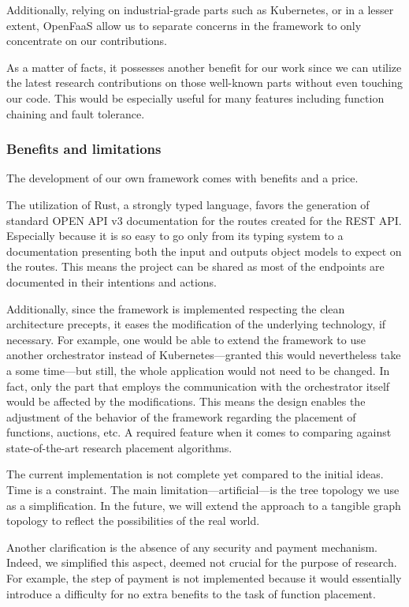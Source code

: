 Additionally, relying on industrial-grade parts such as Kubernetes, or in a lesser extent, OpenFaaS allow us to separate concerns in the framework to only concentrate on our contributions. 

As a matter of facts, it possesses another benefit for our work since we can utilize the latest research contributions on those well-known parts without even touching our code. This would be especially useful for many features including function chaining and fault tolerance.

\subsubsection{Benefits and limitations}

The development of our own framework comes with benefits and a price.

The utilization of Rust, a strongly typed language, favors the generation of standard OPEN API v3 documentation for the routes created for the \gls{REST} \gls{API}. Especially because it is so easy to go only from its typing system to a documentation presenting both the input and outputs object models to expect on the routes. This means the project can be shared as most of the endpoints are documented in their intentions and actions.

Additionally, since the framework is implemented respecting the clean architecture precepts, it eases the modification of the underlying technology, if necessary. For example, one would be able to extend the framework to use another orchestrator instead of Kubernetes—granted this would nevertheless take a some time—but still, the whole application would not need to be changed. In fact, only the part that employs the communication with the orchestrator itself would be affected by the modifications. This means the design enables the adjustment of the behavior of the framework regarding the placement of functions, auctions, etc. A required feature when it comes to comparing against state-of-the-art research placement algorithms.

The current implementation is not complete yet compared to the initial ideas. Time is a constraint. The main limitation—artificial—is the tree topology we use as a simplification. In the future, we will extend the approach to a tangible graph topology to reflect the possibilities of the real world.

Another clarification is the absence of any security and payment mechanism. Indeed, we simplified this aspect, deemed not crucial for the purpose of research. For example, the step of payment is not implemented because it would essentially introduce a difficulty for no extra benefits to the task of function placement.

